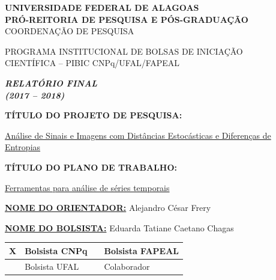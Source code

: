 \documentclass[12pt,letterpaper]{article}
\begin{document}
\onehalfspacing 
\thispagestyle{empty}

\begin{center}
\vspace{0.2cm}

\hrulefill

\textbf{UNIVERSIDADE FEDERAL DE ALAGOAS}\\
\textbf{PRÓ-REITORIA DE PESQUISA E PÓS-GRADUAÇÃO}\\
COORDENAÇÃO DE PESQUISA

\hrulefill

\vspace{0.5cm}

PROGRAMA INSTITUCIONAL DE BOLSAS DE INICIAÇÃO\\ CIENTÍFICA -- PIBIC CNPq/UFAL/FAPEAL

\vspace{1.0cm}

\textbf{\textit{\Large{RELATÓRIO FINAL \\ (2017 -- 2018)}}}\\

\vspace{1.2cm}

\textbf{TÍTULO DO PROJETO DE PESQUISA:}

\underline{Análise de Sinais e Imagens com Distâncias Estocásticas e Diferenças de Entropias}

\vspace{0.6cm}

\textbf{TÍTULO DO PLANO DE TRABALHO:}

\underline{Ferramentas para análise de séries temporais}

\end{center}

\textbf{\underline{NOME DO ORIENTADOR:}} Alejandro César Frery 

\vspace{0.4cm}

\textbf{\underline{NOME DO BOLSISTA:}} Eduarda Tatiane Caetano Chagas

\vspace{1cm}

\begin{table}[!h]
\begin{center}
\begin{tabularx}{\textwidth}{|X|X|X|X|}
\hline                              
\hspace{1.3cm} X & Bolsista CNPq &  &Bolsista FAPEAL\\
\hline             
& Bolsista UFAL &  &Colaborador\\
\hline     
\end{tabularx}
\end{center}
\end{table}
\end{document}
